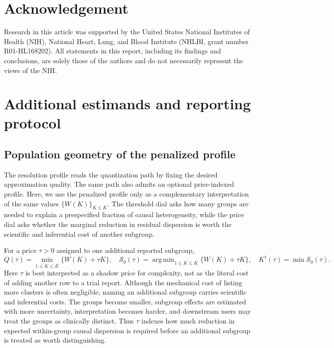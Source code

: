 \documentclass[11pt]{article}
\DeclareMathOperator*{\argmin}{arg\,min}
\newcommand{\calS}{\mathcal S}
\begin{document}
\section*{Acknowledgement}
Research in this article was supported by the United States National Institutes of Health (NIH), National Heart, Lung, and Blood Institute (NHLBI, grant number R01-HL168202). All statements in this report, including its findings and conclusions, are solely those of the authors and do not necessarily represent the views of the NIH.





\singlespacing


\singlespacing

\newpage
\appendix
\setcounter{page}{1}
\setcounter{section}{0}
\renewcommand{\thesection}{S\arabic{section}}
\renewcommand{\appendixname}{Supplementary Material}

\section{Additional estimands and reporting protocol}
\subsection{Population geometry of the penalized profile}\label{sec:geometry_penalized_profile_supp}

The resolution profile reads the quantization path by fixing the desired approximation quality. The same path also admits an optional price-indexed profile.  
Here, we use the penalized profile only as a complementary interpretation of the same values $\{W(K)\}_{K\le\overline K}$. The threshold dial asks how many groups are needed to explain a prespecified fraction of causal heterogeneity, while the price dial asks whether the marginal reduction in residual dispersion is worth the scientific and inferential cost of another subgroup. 

For a price $\tau>0$ assigned to one additional reported subgroup, 
\begin{equation}\label{eq:Qdef}
    Q(\tau)=\min_{1\le K\le\overline K}\{W(K)+\tau K\},
    \quad
    \calS_0(\tau)=\argmin_{1\le K\le\overline K}\{W(K)+\tau K\},
    \quad
    K^\dagger(\tau)=\min\calS_0(\tau).
    \end{equation}
Here $\tau$ is best interpreted as a shadow price for complexity, not as the literal cost of adding another row to a trial report.  Although the mechanical cost of listing more clusters is often negligible, naming an additional subgroup carries scientific and inferential costs. The groups become smaller, subgroup effects are estimated with more uncertainty, interpretation becomes harder, and downstream users may treat the groups as clinically distinct.  Thus $\tau$ indexes how much reduction in expected within-group causal dispersion is required before an additional subgroup is treated as worth distinguishing.
\end{document}
